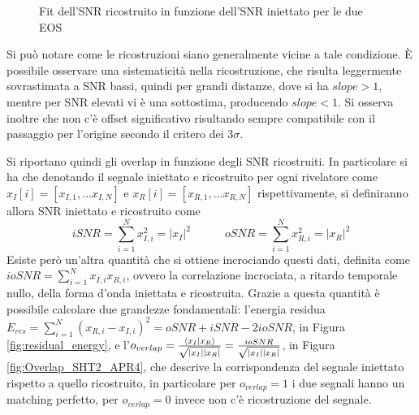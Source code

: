\begin{figure}[ht]
	\vspace{-8pt}
	\caption{Fit dell'SNR ricostruito in funzione dell'SNR iniettato per le due EOS}
	\label{fig:overlap}
	\vspace{-10pt}
\end{figure}
Si può notare come le ricostruzioni siano generalmente vicine a tale condizione. È possibile osservare una sistematicità nella ricostruzione, che risulta leggermente sovrastimata a SNR bassi, quindi per grandi distanze, dove si ha $slope > 1$, mentre per SNR elevati vi è una sottostima, producendo $slope < 1$. Si osserva inoltre che non c'è offset significativo risultando sempre compatibile con il passaggio per l'origine secondo il critero dei $3\sigma$.

Si riportano quindi gli overlap in funzione degli SNR ricostruiti. In particolare si ha che denotando il segnale iniettato e ricostruito per ogni rivelatore come $x_{I}[i]= [x_{I,1}, \dots x_{I,N}]$ e $x_{R}[i]= [x_{R,1}, \dots x_{R,N}]$ rispettivamente, si definiranno allora SNR iniettato e ricostruito come
\begin{equation}
	iSNR = \sum_{i=1}^{N}x_{I, i}^2 = |x_{I}|^2 \quad\quad\quad oSNR = \sum_{i=1}^{N}x_{R, i}^2 = |x_{R}|^2
	\label{eqn:iSNR_oSNR}
\end{equation} 
Esiste però un'altra quantità che si ottiene incrociando questi dati, definita come $ioSNR = \sum_{i=1}^{N}x_{I, i}x_{R, i}$, ovvero la correlazione incrociata, a ritardo temporale nullo, della forma d'onda iniettata e ricostruita. Grazie a questa quantità è possibile calcolare due grandezze fondamentali: l'energia residua $E_{res}= \sum_{i=1}^{N}(x_{R, i}-x_{I, i})^2 = oSNR + iSNR - 2ioSNR$, in Figura \ref{fig:residual_energy}, e l'$o_{verlap} = \frac{\braket{x_I}{x_R}}{\sqrt{|x_I||x_R|}} = \frac{ioSNR}{\sqrt{|x_I||x_R|}}$, in Figura \ref{fig:Overlap_SHT2_APR4}, che descrive la corrispondenza del segnale iniettato rispetto a quello ricostruito, in particolare per $o_{verlap}=1$ i due segnali hanno un matching perfetto, per $o_{verlap}=0$ invece non c'è ricostruzione del segnale.
